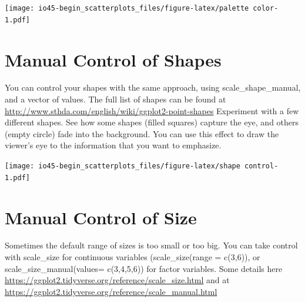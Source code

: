 \documentclass[
]{book}
\newenvironment{Shaded}{\begin{snugshade}}{\end{snugshade}}
\newcommand{\DataTypeTok}[1]{\textcolor[rgb]{0.13,0.29,0.53}{#1}}
\newcommand{\DecValTok}[1]{\textcolor[rgb]{0.00,0.00,0.81}{#1}}
\newcommand{\KeywordTok}[1]{\textcolor[rgb]{0.13,0.29,0.53}{\textbf{#1}}}
\newcommand{\NormalTok}[1]{#1}
\newcommand{\OperatorTok}[1]{\textcolor[rgb]{0.81,0.36,0.00}{\textbf{#1}}}
\newcommand{\StringTok}[1]{\textcolor[rgb]{0.31,0.60,0.02}{#1}}
\begin{document}
\texttt{[image: io45-begin\_scatterplots\_files/figure-latex/palette color-1.pdf]}

\hypertarget{manual-control-of-shapes}{%
\chapter{Manual Control of Shapes}\label{manual-control-of-shapes}}

You can control your shapes with the same approach, using scale\_shape\_manual, and a vector of values.
The full list of shapes can be found at \url{http://www.sthda.com/english/wiki/ggplot2-point-shapes}
Experiment with a few different shapes. See how some shapes (filled squares) capture the eye, and others (empty circle) fade into the background. You can use this effect to draw the viewer's eye to the information that you want to emphasize.

\begin{Shaded}
\end{Shaded}

\texttt{[image: io45-begin\_scatterplots\_files/figure-latex/shape control-1.pdf]}

\hypertarget{manual-control-of-size}{%
\chapter{Manual Control of Size}\label{manual-control-of-size}}

Sometimes the default range of sizes is too small or too big. You can take control with scale\_size for continuous variables (scale\_size(range = c(3,6)), or scale\_size\_manual(values= c(3,4,5,6)) for factor variables. Some details here \url{https://ggplot2.tidyverse.org/reference/scale_size.html} and at
\url{https://ggplot2.tidyverse.org/reference/scale_manual.html}
\end{document}
